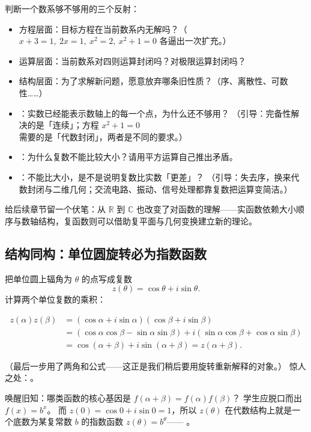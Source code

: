 \begin{explore}
\begin{method}
判断一个数系够不够用的三个反射：
\begin{itemize}
  \item 方程层面：目标方程在当前数系内无解吗？（$x+3=1,\ 2x=1,\ x^2=2,\ x^2+1=0$ 各逼出一次扩充。）
  \item 运算层面：当前数系对四则运算封闭吗？对极限运算封闭吗？
  \item 结构层面：为了求解新问题，愿意放弃哪条旧性质？（序、离散性、可数性……）
\end{itemize}
\end{method}

\begin{itemize}
  \item {}：实数已经能表示数轴上的每一个点，为什么还不够用？
        （引导：完备性解决的是「连续」；方程 $x^2+1=0$ 需要的是「代数封闭」，两者是不同的要求。）
  \item {}：为什么复数不能比较大小？请用平方运算自己推出矛盾。
  \item {}：不能比大小，是不是说明复数比实数「更差」？
        （引导：失去序，换来代数封闭与二维几何；交流电路、振动、信号处理都靠复数把运算变简洁。）
\end{itemize}
给后续章节留一个伏笔：从 $\mathbb{R}$ 到 $\mathbb{C}$ 也改变了对函数的理解——实函数依赖大小顺序与数轴结构，复函数则可以借助复平面与几何变换建立新的理论。

\subsection{结构同构：单位圆旋转必为指数函数}

把单位圆上辐角为 $\theta$ 的点写成复数
\[
  z(\theta)=\cos\theta+i\sin\theta.
\]
计算两个单位复数的乘积：
\begin{derivation}
\begin{align*}
  z(\alpha)z(\beta)&=(\cos\alpha+i\sin\alpha)(\cos\beta+i\sin\beta)\\
  &=(\cos\alpha\cos\beta-\sin\alpha\sin\beta)+i(\sin\alpha\cos\beta+\cos\alpha\sin\beta)\\
  &=\cos(\alpha+\beta)+i\sin(\alpha+\beta)=z(\alpha+\beta).
\end{align*}
\end{derivation}
（最后一步用了两角和公式——这正是我们稍后要用旋转重新解释的对象。）
惊人之处：。

唤醒旧知：哪类函数的核心基因是 $f(\alpha+\beta)=f(\alpha)f(\beta)$？
学生应脱口而出 $f(x)=b^x$。
而 $z(0)=\cos0+i\sin0=1$，所以 $z(\theta)$ 在代数结构上就是一个底数为某复常数 $b$ 的指数函数 $z(\theta)=b^\theta$——
。


\end{explore}
